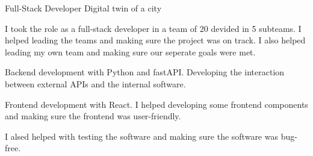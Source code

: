 

\begin{cventries}


    \cventry
    {Full-Stack Developer} %
    {Digital twin of a city} %
    {} 
    {}
    {
      \begin{cvitems} %
        \item {I took the role as a full-stack developer in a team of 20 devided in 5 subteams. I helped leading the teams and making sure the project was on track. I also helped leading my own team and making sure our seperate goals were met.}
        \item {Backend development with Python and fastAPI. Developing the interaction between external APIs and the internal software.}
        \item {Frontend development with React. I helped developing some frontend components and making sure the frontend was user-friendly.}
        \item {I alsed helped with testing the software and making sure the software was bug-free.}
      \end{cvitems}
    }


\end{cventries}
